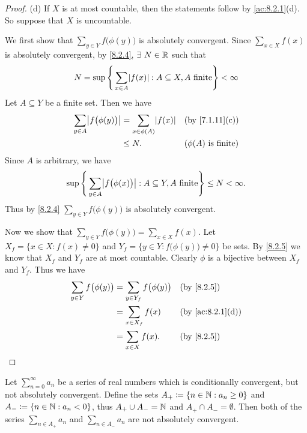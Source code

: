 \begin{proof}{(d)}
  If \(X\) is at most countable, then the statements follow by \cref{ac:8.2.1}(d).
  So suppose that \(X\) is uncountable.

  We first show that \(\sum_{y \in Y} f\big(\phi(y)\big)\) is absolutely convergent.
  Since \(\sum_{x \in X} f(x)\) is absolutely convergent, by \cref{8.2.4}, \(\exists\ N \in \R\) such that
  \[
    N = \sup\Bigg\{\sum_{x \in A} \abs{f(x)} : A \subseteq X, A \text{ finite}\Bigg\} < \infty
  \]
  Let \(A \subseteq Y\) be a finite set.
  Then we have
  \begin{align*}
    \sum_{y \in A} \abs{f\big(\phi(y)\big)} & = \sum_{x \in \phi(A)} \abs{f(x)} &  & \text{(by \cref{7.1.11}(c))}   \\
                                            & \leq N.                           &  & \text{(\(\phi(A)\) is finite)}
  \end{align*}
  Since \(A\) is arbitrary, we have
  \[
    \sup\Bigg\{\sum_{y \in A} \abs{f\big(\phi(x)\big)} : A \subseteq Y, A \text{ finite}\Bigg\} \leq N < \infty.
  \]
  Thus by \cref{8.2.4} \(\sum_{y \in Y} f\big(\phi(y)\big)\) is absolutely convergent.

  Now we show that \(\sum_{y \in Y} f\big(\phi(y)\big) = \sum_{x \in X} f(x)\).
  Let \(X_f = \{x \in X : f(x) \neq 0\}\) and \(Y_f = \{y \in Y : f\big(\phi(y)\big) \neq 0\}\) be sets.
  By \cref{8.2.5} we know that \(X_f\) and \(Y_f\) are at most countable.
  Clearly \(\phi\) is a bijective between \(X_f\) and \(Y_f\).
  Thus we have
  \begin{align*}
    \sum_{y \in Y} f\big(\phi(y)\big) & = \sum_{y \in Y_f} f\big(\phi(y)\big) &  & \text{(by \cref{8.2.5})}       \\
                                      & = \sum_{x \in X_f} f(x)               &  & \text{(by \cref{ac:8.2.1}(d))} \\
                                      & = \sum_{x \in X} f(x).                &  & \text{(by \cref{8.2.5})}
  \end{align*}
\end{proof}

\begin{lem}\label{8.2.7}
  Let \(\sum_{n = 0}^\infty a_n\) be a series of real numbers which is conditionally convergent, but not absolutely convergent.
  Define the sets \(A_+ \coloneqq \{n \in \mathbb{N} : a_n \geq 0\}\) and \(A_- \coloneqq \{n \in \mathbb{N} : a_n < 0\}\), thus \(A_+ \cup A_- = \mathbb{N}\) and \(A_+ \cap A_- = \emptyset\).
  Then both of the series \(\sum_{n \in A_+} a_n\) and \(\sum_{n \in A_-} a_n\) are not absolutely convergent.
\end{lem}

